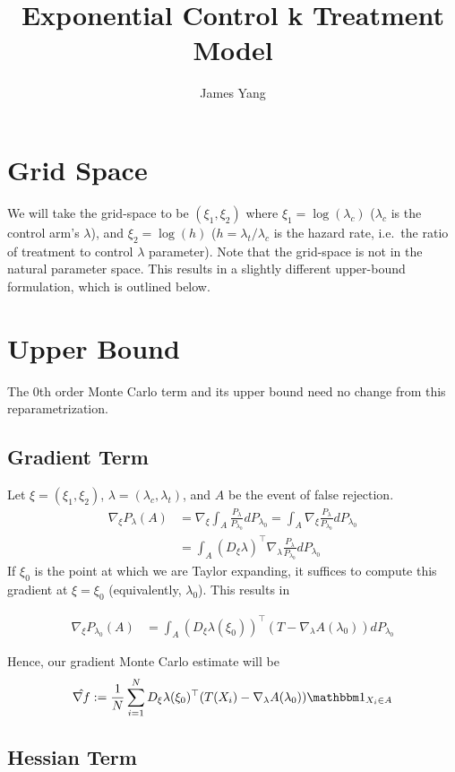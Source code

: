 \documentclass[10pt, a4paper]{article}
\begin{document}
\title{Exponential Control k Treatment Model}
\author{James Yang}
\maketitle

\section*{Grid Space}

We will take the grid-space to be $(\xi_1, \xi_2)$
where $\xi_1 = \log(\lambda_c)$ ($\lambda_c$ is the control arm's $\lambda$),
and $\xi_2 = \log(h)$ ($h = \lambda_t / \lambda_c$ is the hazard rate,
i.e.\ the ratio of treatment to control $\lambda$ parameter).
Note that the grid-space is not in the natural parameter space.
This results in a slightly different upper-bound formulation,
which is outlined below.

\section*{Upper Bound}

The 0th order Monte Carlo term and its upper bound
need no change from this reparametrization.

\subsection*{Gradient Term}

Let $\xi = (\xi_1, \xi_2)$, $\lambda = (\lambda_c, \lambda_t)$,
and $A$ be the event of false rejection.
\begin{align*}
    \nabla_{\xi} P_\lambda(A) 
    &=
    \nabla_{\xi} \int_A \frac{P_{\lambda}}{P_{\lambda_0}} dP_{\lambda_0}
    =
    \int_A \nabla_{\xi} \frac{P_{\lambda}}{P_{\lambda_0}} dP_{\lambda_0}
    \\&=
    \int_A (D_{\xi}\lambda)^\top \nabla_{\lambda} \frac{P_{\lambda}}{P_{\lambda_0}} dP_{\lambda_0}
\end{align*}
If $\xi_0$ is the point at which we are Taylor expanding,
it suffices to compute this gradient at $\xi = \xi_0$ (equivalently, $\lambda_0$).
This results in

\begin{align*}
    \nabla_{\xi} P_{\lambda_0}(A) 
    &=
    \int_A (D_{\xi}\lambda(\xi_0))^\top (T - \nabla_\lambda A(\lambda_0)) dP_{\lambda_0}
\end{align*}

Hence, our gradient Monte Carlo estimate will be
\begin{align*}
    \hat{\nabla f}
    :=
    \frac{1}{N}
    \sum\limits_{i=1}^N
    D_{\xi} \lambda(\xi_0)^\top (T(X_i)-\nabla_\lambda A(\lambda_0)) \indic{X_i \in A}
\end{align*}

\subsection*{Hessian Term}
\end{document}
